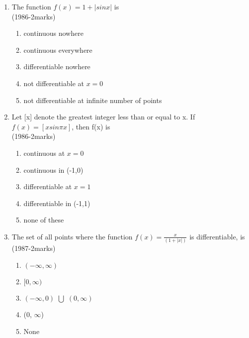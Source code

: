 \documentclass[journal,12pt,twocolumn]{IEEEtran}
\theoremstyle{remark}
\begin{document}
\begin{enumerate}
\item The function $f(x)=1+|sinx|$ is \\
\hfill{(1986-2marks)} 
\begin{enumerate}[label=\alph*)]
    \item continuous nowhere
    \item continuous everywhere
    \item differentiable nowhere 
    \item not differentiable at $x=0$
    \item not differentiable at infinite number of points
\end{enumerate} 

\item Let [x] denote the greatest integer less than or equal to x. If $f(x)=[xsin \pi x]$, then f(x) is \\
\hfill{(1986-2marks)} \\
\begin{enumerate}[label=\alph*)]
    \item continuous at $x=0$
    \item continuous in (-1,0)
    \item differentiable at $x=1$ 
    \item differentiable in (-1,1) 
    \item none of these 
\end{enumerate}


\item The set of all points where the function $f(x)=\frac{x}{(1+|x|)}$ is differentiable, is \\
\hfill{(1987-2marks)} \\

\begin{enumerate}
    \item \((- \infty, \infty)\)
    \item \([0, \infty)\)
    \item \((- \infty,0)\) $\bigcup$ \((0, \infty)\)
    \item (0, $\infty$)
    \item None
\end{enumerate}


\end{enumerate}
\end{document}
